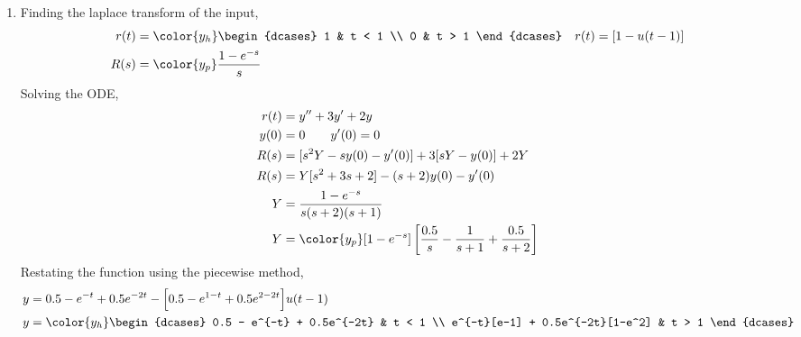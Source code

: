 \begin{enumerate}
    \item Finding the laplace transform of the input,
          \begin{align}
              r(t)           & = \color{y_h}
              \begin{dcases}
                  1 & t < 1 \\
                  0 & t > 1
              \end{dcases} &
              r(t)           & = [1 - u(t-1)]                     \\
              R(s)           & = \color{y_p} \frac{1 - e^{-s}}{s}
          \end{align}
          Solving the ODE,
          \begin{align}
              r(t) & = y'' + 3y' + 2y                               \\
              y(0) & = 0 \qquad y'(0) = 0                           \\
              R(s) & = [s^2Y - sy(0) - y'(0)] + 3[sY - y(0)] + 2Y   \\
              R(s) & = Y[s^2 + 3s + 2] - (s+2)y(0) - y'(0)          \\
              Y    & = \frac{1 - e^{-s}}{s(s+2)(s+1)}               \\
              Y    & = \color{y_p} [1 - e^{-s}]\left[ \frac{0.5}{s}
                  - \frac{1}{s+1} + \frac{0.5}{s+2} \right]
          \end{align}
          Restating the function using the piecewise method,
          \begin{align}
              y & = 0.5 - e^{-t} + 0.5e^{-2t} - \Big[0.5 - e^{1-t}
              + 0.5e^{2-2t}\Big]u(t - 1)                           \\
              y & = \color{y_h}
              \begin{dcases}
                  0.5 - e^{-t} + 0.5e^{-2t}       & t < 1 \\
                  e^{-t}[e-1] + 0.5e^{-2t}[1-e^2] & t > 1
              \end{dcases}
          \end{align}


\end{enumerate}
